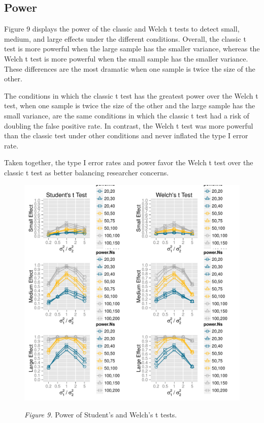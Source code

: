 \documentclass[man,a4paper,noextraspace,apacite]{apa6}\usepackage[]{graphicx}\usepackage[]{color}
\makeatletter
\def\maxwidth{ %
  \ifdim\Gin@nat@width>\linewidth
    \linewidth
  \else
    \Gin@nat@width
  \fi
}
\newenvironment{knitrout}{}{} %
\makeatother
\begin{document}
\subsection{Power}




    Figure 9 displays the power of the classic and Welch t tests to detect small, medium, and large effects under the different conditions. Overall, the classic t test is more powerful when the large sample has the smaller variance, whereas the Welch t test is more powerful when the small sample has the smaller variance. These differences are the most dramatic when one sample is twice the size of the other. 
    
    The conditions in which the classic t test has the greatest power over the Welch t test, when one sample is twice the size of the other and the large sample has the small variance, are the same conditions in which the classic t test had a risk of doubling the false positive rate. In contrast, the Welch t test was more powerful than the classic test under other conditions and never inflated the type I error rate.

    Taken together, the type I error rates and power favor the Welch t test over the classic t test as better balancing researcher concerns.
\begin{figure}
\begin{knitrout}
\color{fgcolor}
\includegraphics[width=\maxwidth]{figure/plotPower} 

\end{knitrout}
\textit{Figure 9.} Power of Student's and Welch's t tests.
\end{figure}
\end{document}
